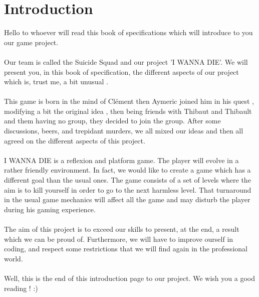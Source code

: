 \setcounter{page}{4}
\chapter*{Introduction}

	Hello to whoever will read this book of specifications which will introduce to you our game project.
	\\\\
	Our team is called the Suicide Squad and our project 'I WANNA DIE'.
	We will present you, in this book of specification, the different aspects of our project which is, trust me, a bit unusual .
	\\\\
	This game is born in the mind of Clément then Aymeric joined him in his quest , modifying a bit the original idea , then being friends with Thibaut and Thibault and them having no group, they decided to join the group. After some discussions, beers, and trepidant murders, we all mixed our ideas and then all agreed on the different aspects of this project.
	\\\\
	I WANNA DIE is a reflexion and platform game. The player will evolve in a rather friendly environment.
	In fact, we would like to create a game which has a different goal than the usual ones. The game consists of a set of levels where the aim is to kill yourself in order to go to the next harmless level. That turnaround in the usual game mechanics will affect all the game and may disturb the player during his gaming experience.
	\\\\
	The aim of this project is to exceed our skills to present, at the end, a result which we can be proud of. Furthermore,
	we will have to improve ourself in coding, and respect some restrictions that we will find again in the professional world.
	\\\\
	Well, this is the end of this introduction page to our project. We wish you a good reading ! :)	